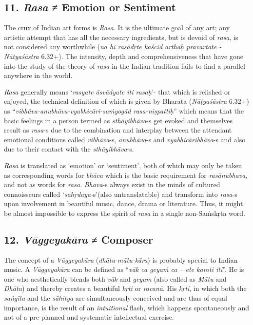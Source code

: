 \subsection*{11. \textit{Rasa} ≠ Emotion or Sentiment}

The crux of Indian art forms is \textit{Rasa}. It is the ultimate goal of any art; any artistic attempt that has all the necessary ingredients, but is devoid of \textit{rasa}, is not considered any worthwhile (\textit{na hi rasādṛte kaścid arthaḥ pravartate - Nātyaśāstra} 6.32+). The intensity, depth and comprehensiveness that have gone into the study of the theory of \textit{rasa} in the Indian tradition fails to find a parallel anywhere in the world.

\textit{Rasa} generally means ‘\textit{rasyate āsvādyate iti rasaḥ}’- that which is relished or enjoyed, the technical definition of which is given by Bharata (\textit{Nāṭyaśāstra} 6.32+) as “\textit{vibhāva-anubhāva-vyabhicāri-saṁyogād rasa-niṣpattiḥ}” which means that the basic feelings in a person termed as \textit{sthāyibhāva}-s get evoked and themselves result as \textit{rasa}­-s due to the combination and interplay between the attendant emotional conditions called \textit{vibhāva}-s, \textit{anubhāva}-s and \textit{vyabhicāribhāva}-s and also due to their contact with the \textit{sthāyibhāva}-s.

\textit{Rasa} is translated as ‘emotion’ or ‘sentiment’, both of which may only be taken as corresponding words for \textit{bhāva} which is the basic requirement for \textit{rasānubhava}, and not as words for \textit{rasa}. \textit{Bhāva}-s always exist in the minds of cultured connoisseurs called ‘\textit{sahṛdaya}-s’\break (also untranslatable) and transform into \textit{rasa}-s upon involvement in beautiful music, dance, drama or literature. Thus, it might be almost impossible to express the spirit of \textit{rasa} in a single non-Saṁskṛta word.


\subsection*{12. \textit{Vāggeyakāra} ≠ Composer}

The concept of a \textit{Vāggeyakāra} (\textit{dhātu-mātu-kāra}) is probably special to Indian music. A \textit{Vāggeyakāra} can be defined as “\textit{vāk ca geyaṁ ca – ete karoti iti}”. He is one who aesthetically blends both \textit{vāk} and \textit{geyam} (also called as \textit{Mātu} and \textit{Dhātu}) and thereby creates a beautiful \textit{kṛti} or \textit{racanā}. His \textit{kṛti}, in which both the \textit{saṅgīta} and the \textit{sāhitya} are simultaneously conceived and are thus of equal importance, is the result of an \textit{intuitional} flash, which happens spontaneously and not of a pre-planned and systematic intellectual exercise.

